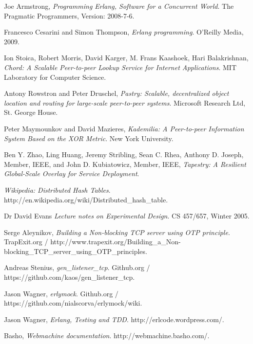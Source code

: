 \begin{thebibliography}{9}

  Joe Armstrong,
  \emph{Programming Erlang, Software for a Concurrent World}.
  The Pragmatic Programmers,
  Version: 2008-7-6.

  Francesco Cesarini and Simon Thompson,
  \emph{Erlang programming}.
  O'Reilly Media,
  2009.

  Ion Stoica, Robert Morris, David Karger, M. Frans Kaashoek, Hari Balakrishnan,
  \emph{Chord: A Scalable Peer-to-peer Lookup Service for Internet Applications}.
  MIT Laboratory for Computer Science.

  Antony Rowstron	and Peter Druschel,
  \emph{Pastry: Scalable, decentralized object location and routing for large-scale peer-to-peer systems}.
  Microsoft Research Ltd, St. George House.

  Peter Maymounkov and David Mazieres,
  \emph{Kademilia: A Peer-to-peer Information System Based on the XOR Metric}.
  New York University.

  Ben Y. Zhao, Ling Huang, Jeremy Stribling, Sean C. Rhea, Anthony D. Joseph, Member, IEEE, and John D. Kubiatowicz, Member, IEEE,
  \emph{Tapestry: A Resilient Global-Scale Overlay for Service Deployment}.

  \emph{Wikipedia: Distributed Hash Tables}.
  http://en.wikipedia.org/wiki/Distributed\_hash\_table.
  
  Dr David Evans
  \emph{Lecture notes on Experimental Design}.
  CS 457/657,	Winter 2005.

  Serge Aleynikov,
  \emph{Building a Non-blocking TCP server using OTP principle}.
  TrapExit.org / http://www.trapexit.org/Building\_a\_Non-blocking\_TCP\_server\_using\_OTP\_principles.

  Andreas Stenius,
  \emph{gen\_listener\_tcp}.
  Github.org / https://github.com/kaos/gen\_listener\_tcp.

  Jason Wagner,
  \emph{erlymock}.
  Github.org / https://github.com/nialscorva/erlymock/wiki.

  Jason Wagner,
  \emph{Erlang, Testing and TDD}.
  http://erlcode.wordpress.com/.

  Basho,
  \emph{Webmachine documentation}.
  http://webmachine.basho.com/.

\end{thebibliography}
